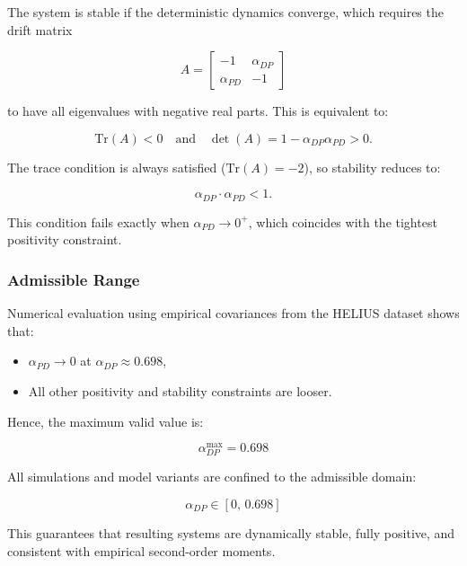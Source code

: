 \documentclass[
]{article}
\providecommand{\tightlist}{%
  \setlength{\itemsep}{0pt}\setlength{\parskip}{0pt}}\usepackage{longtable,booktabs,array}
\begin{document}
The system is stable if the deterministic dynamics converge, which
requires the drift matrix

\[
A = \begin{bmatrix}
-1 & \alpha_{DP} \\
\alpha_{PD} & -1
\end{bmatrix}
\]

to have all eigenvalues with negative real parts. This is equivalent to:

\[
\text{Tr}(A) < 0 \quad \text{and} \quad \det(A) = 1 - \alpha_{DP} \alpha_{PD} > 0.
\]

The trace condition is always satisfied (\(\text{Tr}(A) = -2\)), so
stability reduces to:

\[
\alpha_{DP} \cdot \alpha_{PD} < 1.
\]

This condition fails exactly when \(\alpha_{PD} \to 0^+\), which
coincides with the tightest positivity constraint.

\subsubsection{Admissible Range}\label{admissible-range}

Numerical evaluation using empirical covariances from the HELIUS dataset
shows that:

\begin{itemize}
\tightlist
\item
  \(\alpha_{PD} \to 0\) at \(\alpha_{DP} \approx 0.698\),
\item
  All other positivity and stability constraints are looser.
\end{itemize}

Hence, the maximum valid value is:

\[
\boxed{\alpha_{DP}^{\max} = 0.698}
\]

All simulations and model variants are confined to the admissible
domain:

\[
\alpha_{DP} \in [0,\, 0.698]
\]

This guarantees that resulting systems are dynamically stable, fully
positive, and consistent with empirical second-order moments.
\end{document}
